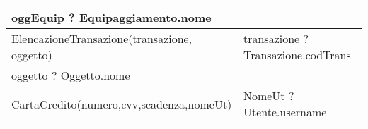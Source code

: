 \begin{table}[H]
{\begin{tabular}{|l|l|}
oggEquip ? Equipaggiamento.nome                                                                                                                                                                                                            &                                            \\ \hline
ElencazioneTransazione(transazione, oggetto)                                                                                                                                                                                               & transazione ? Transazione.codTrans         \\ \hline
oggetto ? Oggetto.nome                                                                                                                                                                                                                     &                                            \\ \hline
CartaCredito(numero,cvv,scadenza,nomeUt)                                                                                                                                                                                                   & NomeUt ? Utente.username                   \\ \hline
\end{tabular}
}
\end{table}